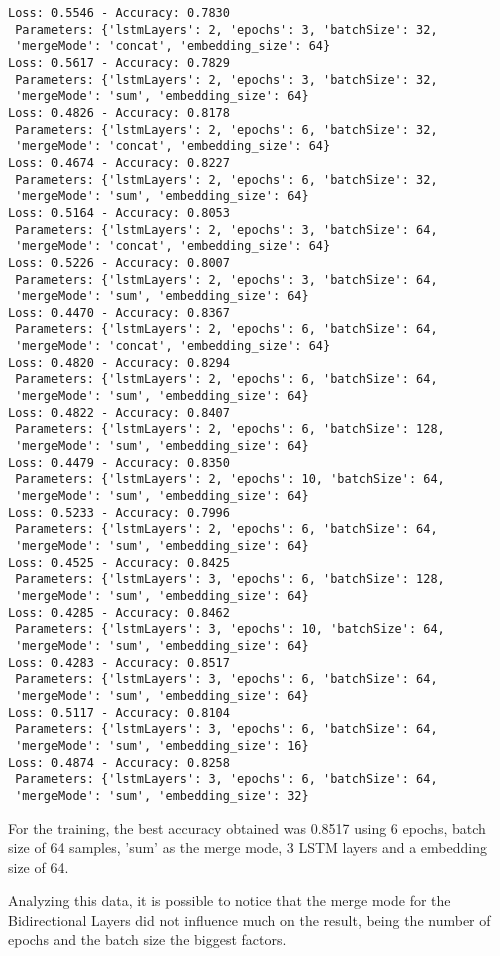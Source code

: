 \documentclass{article}
\begin{document}
\begin{verbatim}
Loss: 0.5546 - Accuracy: 0.7830
 Parameters: {'lstmLayers': 2, 'epochs': 3, 'batchSize': 32,
 'mergeMode': 'concat', 'embedding_size': 64}
Loss: 0.5617 - Accuracy: 0.7829
 Parameters: {'lstmLayers': 2, 'epochs': 3, 'batchSize': 32,
 'mergeMode': 'sum', 'embedding_size': 64}
Loss: 0.4826 - Accuracy: 0.8178
 Parameters: {'lstmLayers': 2, 'epochs': 6, 'batchSize': 32,
 'mergeMode': 'concat', 'embedding_size': 64}
Loss: 0.4674 - Accuracy: 0.8227
 Parameters: {'lstmLayers': 2, 'epochs': 6, 'batchSize': 32,
 'mergeMode': 'sum', 'embedding_size': 64}
Loss: 0.5164 - Accuracy: 0.8053
 Parameters: {'lstmLayers': 2, 'epochs': 3, 'batchSize': 64,
 'mergeMode': 'concat', 'embedding_size': 64}
Loss: 0.5226 - Accuracy: 0.8007
 Parameters: {'lstmLayers': 2, 'epochs': 3, 'batchSize': 64,
 'mergeMode': 'sum', 'embedding_size': 64}
Loss: 0.4470 - Accuracy: 0.8367
 Parameters: {'lstmLayers': 2, 'epochs': 6, 'batchSize': 64,
 'mergeMode': 'concat', 'embedding_size': 64}
Loss: 0.4820 - Accuracy: 0.8294
 Parameters: {'lstmLayers': 2, 'epochs': 6, 'batchSize': 64,
 'mergeMode': 'sum', 'embedding_size': 64}
Loss: 0.4822 - Accuracy: 0.8407
 Parameters: {'lstmLayers': 2, 'epochs': 6, 'batchSize': 128,
 'mergeMode': 'sum', 'embedding_size': 64}
Loss: 0.4479 - Accuracy: 0.8350
 Parameters: {'lstmLayers': 2, 'epochs': 10, 'batchSize': 64,
 'mergeMode': 'sum', 'embedding_size': 64}
Loss: 0.5233 - Accuracy: 0.7996
 Parameters: {'lstmLayers': 2, 'epochs': 6, 'batchSize': 64,
 'mergeMode': 'sum', 'embedding_size': 64}
Loss: 0.4525 - Accuracy: 0.8425
 Parameters: {'lstmLayers': 3, 'epochs': 6, 'batchSize': 128,
 'mergeMode': 'sum', 'embedding_size': 64}
Loss: 0.4285 - Accuracy: 0.8462
 Parameters: {'lstmLayers': 3, 'epochs': 10, 'batchSize': 64,
 'mergeMode': 'sum', 'embedding_size': 64}
Loss: 0.4283 - Accuracy: 0.8517
 Parameters: {'lstmLayers': 3, 'epochs': 6, 'batchSize': 64,
 'mergeMode': 'sum', 'embedding_size': 64}
Loss: 0.5117 - Accuracy: 0.8104
 Parameters: {'lstmLayers': 3, 'epochs': 6, 'batchSize': 64,
 'mergeMode': 'sum', 'embedding_size': 16}
Loss: 0.4874 - Accuracy: 0.8258
 Parameters: {'lstmLayers': 3, 'epochs': 6, 'batchSize': 64,
 'mergeMode': 'sum', 'embedding_size': 32}

\end{verbatim}

For the training, the best accuracy obtained was 0.8517 using 6 epochs, batch size of 64 samples, 'sum' as the merge mode, 3 LSTM layers and a embedding size of 64.

Analyzing this data, it is possible to notice that the merge mode for the Bidirectional Layers did not influence much on the result, being the number of epochs and the batch size the biggest factors.
\end{document}
